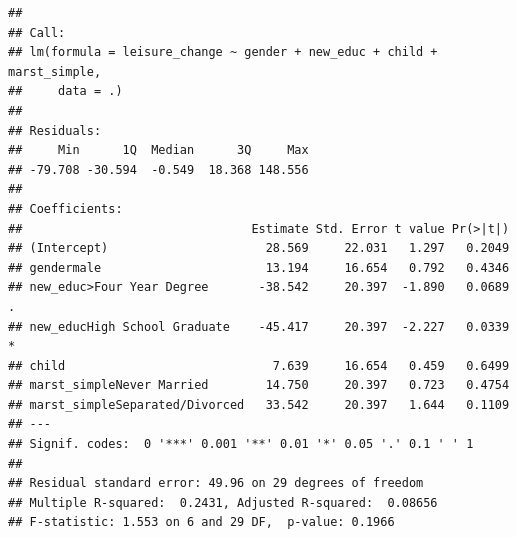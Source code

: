 \documentclass[
]{article}
\begin{document}
\begin{verbatim}
## 
## Call:
## lm(formula = leisure_change ~ gender + new_educ + child + marst_simple, 
##     data = .)
## 
## Residuals:
##     Min      1Q  Median      3Q     Max 
## -79.708 -30.594  -0.549  18.368 148.556 
## 
## Coefficients:
##                                Estimate Std. Error t value Pr(>|t|)  
## (Intercept)                      28.569     22.031   1.297   0.2049  
## gendermale                       13.194     16.654   0.792   0.4346  
## new_educ>Four Year Degree       -38.542     20.397  -1.890   0.0689 .
## new_educHigh School Graduate    -45.417     20.397  -2.227   0.0339 *
## child                             7.639     16.654   0.459   0.6499  
## marst_simpleNever Married        14.750     20.397   0.723   0.4754  
## marst_simpleSeparated/Divorced   33.542     20.397   1.644   0.1109  
## ---
## Signif. codes:  0 '***' 0.001 '**' 0.01 '*' 0.05 '.' 0.1 ' ' 1
## 
## Residual standard error: 49.96 on 29 degrees of freedom
## Multiple R-squared:  0.2431, Adjusted R-squared:  0.08656 
## F-statistic: 1.553 on 6 and 29 DF,  p-value: 0.1966
\end{verbatim}
\end{document}
